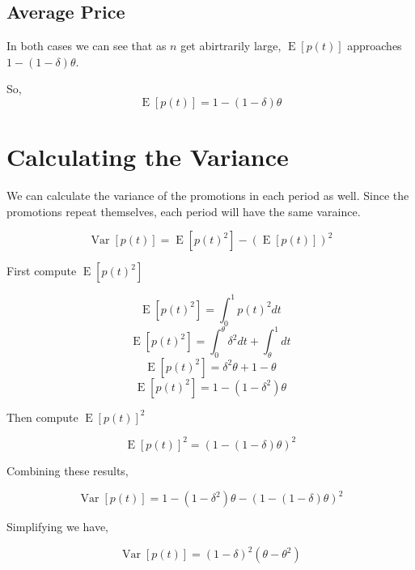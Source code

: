 \documentclass{article}
\DeclareMathOperator{\E}{\mathrm{E}}
\DeclareMathOperator{\Var}{\mathrm{Var}}
\begin{document}
\subsection{Average  Price}

In both cases we can see that as $n$ get abirtrarily large, $\E[p(t)]$ approaches $1 - (1-\delta)\theta$.

So, $$\E[p(t)] = 1 - (1-\delta)\theta $$

\section{Calculating the Variance}

We can calculate the variance of the promotions in each period as well. Since the promotions repeat themselves, each period will have the same varaince.

$$\Var[p(t)] = \E[p(t)^2] - (\E[p(t)])^2$$

First compute $\E[p(t)^2]$

$$\E[p(t)^2] = \int_{0}^{1} p(t)^2 dt $$
$$\E[p(t)^2] = \int_{0}^{\theta} \delta^2 dt + \int_{\theta}^{1} dt$$
$$\E[p(t)^2] = \delta^2 \theta + 1 - \theta $$
$$\E[p(t)^2] = 1 - (1-\delta^2)\theta $$

Then compute $\E[p(t)]^2$

$$\E[p(t)]^2 = (1 - (1-\delta)\theta)^2 $$

Combining these results,

$$\Var[p(t)] = 1 - (1-\delta^2)\theta -  ( 1 - (1-\delta)\theta )^2$$

Simplifying we have,

$$\Var[p(t)] = (1- \delta)^2 (\theta - \theta^2)$$


\end{document}
